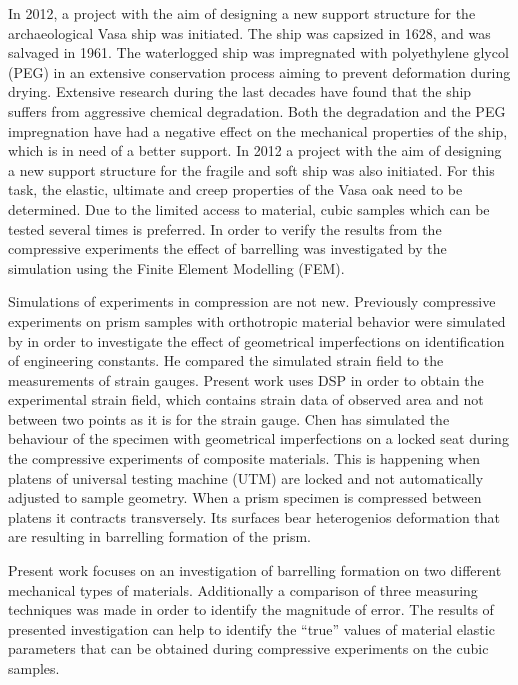 \documentclass[review]{elsarticle}
\begin{document}
In 2012, a project with the aim of designing a new support structure for the
archaeological Vasa ship was initiated. The ship was capsized in 1628, and was salvaged in 1961. 
The waterlogged ship was impregnated with polyethylene glycol (PEG) in an extensive conservation process aiming to prevent deformation during drying. 
Extensive research during the last decades have found that the ship suffers from
aggressive chemical degradation. Both the degradation \cite{bjurhager2012state}
and the PEG impregnation \cite{ljungdahl2007transverse} have had a negative effect on the mechanical properties of the ship, which is in need of a better support. In 2012 a project with the aim of 
designing a new support structure for the fragile and soft ship was also initiated. For this task, the elastic, ultimate and creep properties of the 
Vasa oak need to be determined. Due to the limited access to material, cubic samples which can be tested several times is preferred.
In order to verify the results from the compressive experiments the effect of
barrelling was investigated by the simulation using the Finite Element
Modelling (FEM).

Simulations of experiments in compression are not new. Previously compressive
experiments on prism samples with orthotropic material behavior were simulated
by \cite{Toftegaard1999849} in order to investigate the effect of geometrical imperfections on identification of engineering constants. 
He compared the simulated strain field to the measurements of strain gauges. 
Present work uses DSP in order to obtain the experimental strain field, which
contains strain data of observed area and not between two points as it is for the strain gauge. 
Chen \cite{Chen001} has simulated the behaviour of the specimen with geometrical
imperfections on a locked  seat during the compressive experiments
of composite materials. This is happening when platens of universal testing
machine (UTM) are locked and not automatically adjusted to sample geometry.
When a prism specimen is compressed between platens it contracts transversely.
Its surfaces bear heterogenios deformation that are resulting in barrelling
formation of the prism. 




Present work focuses on an investigation of
barrelling formation on two different mechanical types of materials. Additionally a comparison of three measuring techniques was made in order to identify the magnitude of error.
The results of presented investigation can help to identify the ``true'' values
of material elastic parameters that can be obtained during compressive
experiments on the cubic samples. 
\end{document}
